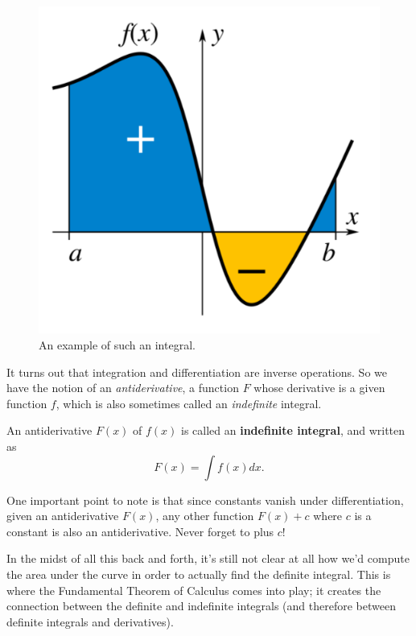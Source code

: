 \documentclass[11 pt]{scrartcl}
\begin{document}
\begin{figure}[!htb]
    \centering
    \includegraphics[scale=0.5]{def_integral.png}
    \caption{An example of such an integral.}
\end{figure}

It turns out that integration and differentiation are inverse operations. So we have the notion of an \emph{antiderivative}, a function $F$ whose derivative is a given function $f$, which is also sometimes called an \emph{indefinite} integral. 

\begin{definition}
    An antiderivative $F(x)$ of $f(x)$ is called an \textbf{indefinite integral}, and written as 
    \[ F(x) =  \int f(x) dx.\] 
\end{definition}

One important point to note is that since constants vanish under differentiation, given an antiderivative $F(x)$, any other function $F(x) + c$ where $c$ is a constant is also an antiderivative. Never forget to plus $c$! 

In the midst of all this back and forth, it's still not clear at all how we'd compute the area under the curve in order to actually find the definite integral. This is where the Fundamental Theorem of Calculus comes into play; it creates the connection between the definite and indefinite integrals (and therefore between definite integrals and derivatives). 
\end{document}
